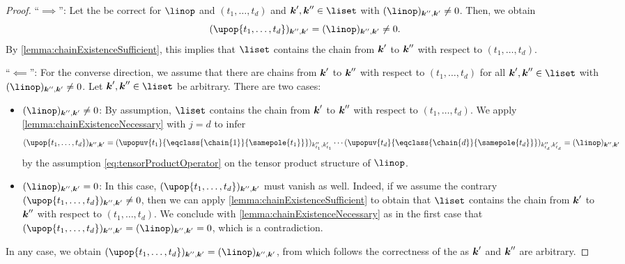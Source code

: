 \begin{proof}
  ``$\implies$'':
  Let the \up be correct for $\linop$ and $(t_1, \dotsc, t_d)$
  and $\*k', \*k'' \in \liset$ with $(\linop)_{\*k'',\*k'} \not= 0$.
  Then, we obtain
  \begin{equation}
    (\upop{t_1,\dotsc,t_d})_{\*k'',\*k'}
    = (\linop)_{\*k'',\*k'}
    \not= 0.
  \end{equation}
  By \cref{lemma:chainExistenceSufficient},
  this implies that $\liset$ contains the chain from ${\boldsymbol{k}}'$ to ${\boldsymbol{k}}''$
  with respect to $(t_1, \dotsc, t_d)$.
  
  ``$\impliedby$'':
  For the converse direction, we assume that there are chains
  from ${\boldsymbol{k}}'$ to ${\boldsymbol{k}}''$ with respect to $(t_1, \dotsc, t_d)$
  for all $\*k', \*k'' \in \liset$ with $(\linop)_{\*k'',\*k'} \not= 0$.
  Let $\*k', \*k'' \in \liset$ be arbitrary.
  There are two cases:
  \begin{itemize}
    \item
    $(\linop)_{\*k'',\*k'} \not= 0$:
    By assumption, $\liset$ contains the chain from ${\boldsymbol{k}}'$ to ${\boldsymbol{k}}''$
    with respect to $(t_1, \dotsc, t_d)$.
    We apply \cref{lemma:chainExistenceNecessary} with $j = d$
    to infer
    \begin{equation}
      (\upop{t_1,\dotsc,t_d})_{\*k'',\*k'}
      =
      (\upopuv{t_1}{\eqclass{\chain{1}}{\samepole{t_1}}})_{k''_{t_1},k'_{t_1}}
      \dotsm
      (\upopuv{t_d}{\eqclass{\chain{d}}{\samepole{t_d}}})_{k''_{t_d},k'_{t_d}}
      = (\linop)_{\*k'',\*k'}
    \end{equation}
    by the assumption \cref{eq:tensorProductOperator} on
    the tensor product structure of $\linop$.
    
    \item
    $(\linop)_{\*k'',\*k'} = 0$:
    In this case, $(\upop{t_1,\dotsc,t_d})_{\*k'',\*k'}$ must vanish as well.
    Indeed, if we assume the contrary
    $(\upop{t_1,\dotsc,t_d})_{\*k'',\*k'} \not= 0$,
    then we can apply \cref{lemma:chainExistenceSufficient}
    to obtain that $\liset$ contains the chain from ${\boldsymbol{k}}'$ to ${\boldsymbol{k}}''$
    with respect to $(t_1, \dotsc, t_d)$.
    We conclude with \cref{lemma:chainExistenceNecessary} as in the first case
    that $(\upop{t_1,\dotsc,t_d})_{\*k'',\*k'} = (\linop)_{\*k'',\*k'} = 0$,
    which is a contradiction.
  \end{itemize}
  In any case, we obtain
  $(\upop{t_1,\dotsc,t_d})_{\*k'',\*k'} = (\linop)_{\*k'',\*k'}$,
  from which follows the correctness of the \up\punctfix{,}
  as ${\boldsymbol{k}}'$ and ${\boldsymbol{k}}''$ are arbitrary.
\end{proof}



